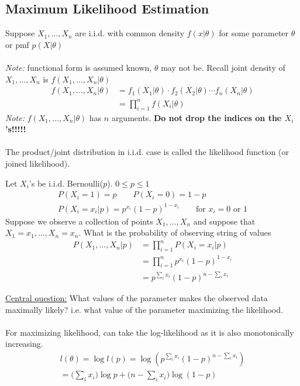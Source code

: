 \subsection*{Maximum Likelihood Estimation}
Suppose $X_1, \ldots, X_n$ are i.i.d. with common density $f(x|\theta)$ for some parameter $\theta$ or pmf $p(X|\theta)$\\\\
\emph{Note:} functional form is assumed known, $\theta$ may not be. Recall joint density of $X_1, \ldots, X_n$ is $f(X_1, \ldots, X_n | \theta)$
\begin{align*}
	f(X_1, \ldots, X_n |\theta) & = f_1(X_1|\theta)\cdot f_2(X_2|\theta) \cdots f_n(X_n|\theta)\\
	& = \prod_{i=1}^n f(X_i|\theta)
\end{align*}
\emph{Note:} $f(X_1, \ldots, X_n |\theta)$ has $n$ arguments. \textbf{Do not drop the indices on the $X_i$'s!!!!!}\\\\
The product/joint distribution in i.i.d. case is called the likelihood function (or joined likelihood).
\begin{example-N}
	Let $X_i$'s be i.i.d. Bernoulli($p$). $0 \leq p \leq 1$
	\begin{gather*}
		P(X_i = 1) = p \qquad 	P(X_i = 0) = 1-p\\
		P(X_i = x_i |p) = p^{x_i} (1-p)^{1-x_i} \qquad \text{for $x_i = 0$ or $1$}
	\end{gather*}
	Suppose we observe a collection of points $X_1, \ldots, X_n$ and suppose that $X_1 = x_1, \ldots, X_n = x_n$. What is the probability of observing string of values
	\begin{align*}
		P(X_1, \ldots, X_n| p) & = \prod_{i=1}^n P(X_i = x_i | p)\\
		& = \prod_{i=1}^n p^{x_i} (1-p)^{1-x_i}\\
		& = p^{\sum_i x_i} (1-p)^{n - \sum_i x_i}
	\end{align*}
\end{example-N}
\underline{Central question:} What values of the parameter makes the observed data maximally likely? i.e. what value of the parameter maximizing the likelihood.\\\\
For maximizing likelihood, can take the log-likelihood as it is also monotonically increasing.
\begin{gather*}
	l(\theta) = \log l(p) = \log (p^{\sum_i x_i} (1-p)^{n- \sum_i x_i})\\
	= \big( \sum_i x_i\big) \log p + \big( n- \sum_i x_i \big) \log (1-p)
\end{gather*}
